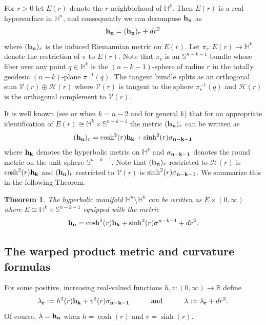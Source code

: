 \documentclass[10pt]{amsart}
\def\R{\mathbb{R}}
\def\s{\sigma}
\def\l{\lambda}
\def\S{\mathcal{S}}
\def\H{\mathbb{H}}
\def\S{\mathbb{S}}
\newtheorem{theorem}{Theorem}[section]
\theoremstyle{definition}
\theoremstyle{remark}
\numberwithin{equation}{section}
\begin{document}
For $r > 0$ let $E(r)$ denote the $r$-neighborhood of $\H^k$.  
Then $E(r)$ is a real hypersurface in $\H^n$, and consequently we can decompose ${\bf h_n}$ as
	\begin{equation*}
	{\bf h_n} = ({\bf h_n})_r + dr^2
	\end{equation*}
where $({\bf h_n})_r$ is the induced Riemannian metric on $E(r)$.  
Let $\pi_r : E(r) \to \H^k$ denote the restriction of $\pi$ to $E(r)$.  
Note that $\pi_r$ is an $\S^{n-k-1}$-bundle whose fiber over any point $q \in \H^k$ is the $(n-k-1)$-sphere of radius $r$ in the totally geodesic $(n-k)$-plane $\pi^{-1}(q)$.  
The tangent bundle splits as an orthogonal sum $\mathcal{V}(r) \oplus \mathcal{H}(r)$ where $\mathcal{V}(r)$ is tangent to the sphere $\pi_r^{-1}(q)$ and $\mathcal{H}(r)$ is the orthogonal complement to $\mathcal{V}(r)$.

It is well known (see \cite{Belegradek real} or \cite{GT} when $k=n-2$ and \cite{Ontaneda} for general $k$) that for an appropriate identification of $E(r) \cong \H^k \times \S^{n-k-1}$ the metric $({\bf h_n})_r$ can be written as
	\begin{equation*}
	({\bf h_n})_r = \cosh^2(r) {\bf h_k} + \sinh^2(r) {\bf \sigma_{n-k-1}}
	\end{equation*}
where ${\bf h_k}$ denotes the hyperbolic metric on $\H^k$ and ${\bf \sigma_{n-k-1}}$ denotes the round metric on the unit sphere $\S^{n-k-1}$.  
Note that $({\bf h_n})_r$ restricted to $\mathcal{H}(r)$ is $\cosh^2(r) {\bf h_k}$ and $({\bf h_n})_r$ restricted to $\mathcal{V}(r)$ is $\sinh^2(r) {\bf \sigma_{n-k-1}}$.  
We summarize this in the following Theorem.

\vskip 20pt

\begin{theorem}\label{thm:hn/hk metric}
The hyperbolic manifold $\H^n \setminus \H^k$ can be written as $E \times (0, \infty)$  where $E \cong \H^k \times \mathbb{S}^{n-k-1}$ equipped with the metric
	\begin{equation}\label{eqn:hn/hk metric}
	{\bf h_n} = \cosh^2(r) {\bf h_k} + \sinh^2(r) \s^{n-k-1} + dr^2 .
	\end{equation}
\end{theorem}

\vskip 10pt



\subsection{The warped product metric and curvature formulas}
For some positive, increasing real-valued functions $h, v : (0,\infty) \to \R$ define
	\begin{equation}\label{eqn:warped metric 1}
	{\bf \l_r} := h^2(r) {\bf h_k} + v^2(r) {\bf \s_{n-k-1}}  \hskip 30pt \text{and} \hskip 30pt {\bf \l} := {\bf \l_r} + dr^2.
	\end{equation}
Of course, ${\bf \l} = {\bf h_n}$ when $h = \cosh(r)$ and $v = \sinh(r)$.  
\end{document}
